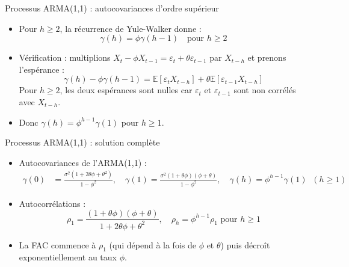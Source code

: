 \documentclass[11pt,aspectratio=169]{beamer}
\newcommand{\E}{\mathbb{E}}
\begin{document}
\begin{frame}{Processus ARMA(1,1) : autocovariances d'ordre supérieur}

\begin{itemize}

\item Pour $h \geq 2$, la récurrence de Yule-Walker donne :
  \[
  \gamma(h) = \phi \gamma(h-1) \quad \text{pour } h \geq 2
  \]\newline

\item Vérification : multiplions $X_t - \phi X_{t-1} = \varepsilon_t + \theta\varepsilon_{t-1}$ par $X_{t-h}$ et prenons l'espérance :
  \[
  \gamma(h) - \phi\gamma(h-1) = \E[\varepsilon_t X_{t-h}] + \theta\E[\varepsilon_{t-1}X_{t-h}]
  \]
  Pour $h \geq 2$, les deux espérances sont nulles car $\varepsilon_t$ et $\varepsilon_{t-1}$ sont non corrélés avec $X_{t-h}$.\newline

\item Donc $\gamma(h) = \phi^{h-1}\gamma(1)$ pour $h \geq 1$.

\end{itemize}

\end{frame}

\begin{frame}{Processus ARMA(1,1) : solution complète}

\begin{itemize}

\item Autocovariances de l'ARMA(1,1) :
  \begin{align*}
  \gamma(0) &= \frac{\sigma^2(1 + 2\theta\phi + \theta^2)}{1 - \phi^2}, \quad
  \gamma(1) = \frac{\sigma^2(1 + \theta\phi)(\phi + \theta)}{1 - \phi^2}, \quad
  \gamma(h) = \phi^{h-1} \gamma(1) \;\; (h \geq 1)
  \end{align*}

\item Autocorrélations :
  \[
  \rho_1 = \frac{(1+\theta\phi)(\phi+\theta)}{1 + 2\theta\phi + \theta^2}, \quad \rho_h = \phi^{h-1}\rho_1 \text{ pour } h \geq 1
  \]\newline

\item La FAC commence à $\rho_1$ (qui dépend à la fois de $\phi$ et $\theta$) puis décroît exponentiellement au taux $\phi$.

\end{itemize}

\end{frame}
\end{document}
